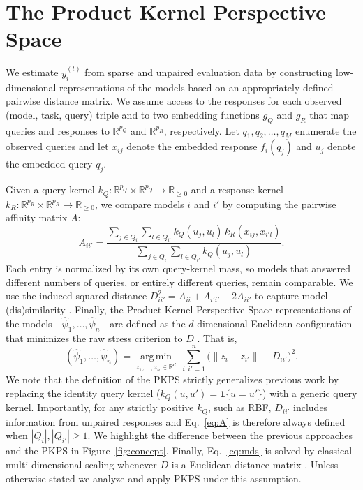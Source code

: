 \documentclass{article}
\theoremstyle{definition}
\theoremstyle{plain}
\newcommand{\PKPS}{PKPS\xspace}
\begin{document}
\section{The Product Kernel Perspective Space}
\label{sec:method}

We estimate $y_i^{(t)}$ from sparse and unpaired
evaluation data by constructing low-dimensional
representations of the models based on an appropriately defined pairwise distance
matrix.
We assume access to the responses for each observed (model, task, query) triple and
to two embedding functions $g_{Q}$ and $g_{R}$ that map
queries and responses to $\mathbb{R}^{p_{Q}}$ and $\mathbb{R}^{p_{R}}$, respectively.
Let $q_{1},q_{2},\hdots, q_{M} $ enumerate the observed queries and let
$x_{ij}$ denote the embedded response $f_{i}(q_{j})$ and $u_{j}$ denote the embedded
query $q_{j}$.

Given a query kernel
$k_Q:\mathbb{R}^{p_{Q}}\times\mathbb{R}^{p_{Q}}\to\mathbb{R}_{\ge0}$ and a response
kernel $k_R:\mathbb{R}^{p_{R}}\times\mathbb{R}^{p_{R}}\to\mathbb{R}_{\ge0}$, we
compare models $i$ and $i'$ by computing the pairwise affinity matrix $ A $:
\begin{equation}
A_{ii'} = \frac{\sum_{j\in Q_i}\sum_{l\in Q_{i'}} k_Q(u_j,u_l)\, k_R(x_{ij},x_{i'l})}
              {\sum_{j\in Q_i}\sum_{l\in Q_{i'}} k_Q(u_j,u_l)}.
\label{eq:A}
\end{equation}
Each entry is normalized by its own query-kernel mass, so models that answered
different numbers of queries, or entirely different queries, remain comparable.
We use the induced squared distance $D^2_{ii'}=A_{ii}+A_{i'i'}-2A_{ii'}$ to capture
model (dis)similarity \citep{gretton2012kernel}.
Finally, the Product Kernel Perspective Space representations of the
models---$\widehat{\psi}_{1},\hdots,\widehat{\psi}_{n}$---are defined as the
$d$-dimensional Euclidean configuration that minimizes the raw stress criterion to
$D$ \citep{trosset2024continuous}. That is,
\begin{equation}
(\hat\psi_1,\dots,\hat\psi_n)=\operatorname*{arg\,min}_{z_1,\dots,z_n\in\mathbb{R}^d}\
\sum_{i,i'=1}^{n}\big(\|z_i-z_{i'}\|-D_{ii'}\big)^2.
\label{eq:mds}
\end{equation}
We note that the definition of the \PKPS strictly generalizes previous work by
replacing the identity query kernel ($k_{Q}(u,u')=\mathbf{1}\{u=u'\}$) with a generic
query kernel.
Importantly, for any strictly positive $k_Q$, such as RBF, $D_{ii'}$ includes information from unpaired responses and Eq.~\eqref{eq:A}
is therefore always defined when $ |Q_{i}|, |Q_{i'}| \ge 1 $.
We highlight the difference between the previous approaches and the \PKPS in Figure~\ref{fig:concept}.
Finally, Eq.~\eqref{eq:mds} is solved by classical multi-dimensional scaling \citep{torgerson1952mds, borg2005modern} whenever $ D $ is a Euclidean distance matrix \citep{Dokmanic_2015}.
Unless otherwise stated we analyze and apply \PKPS under this assumption.
\end{document}
